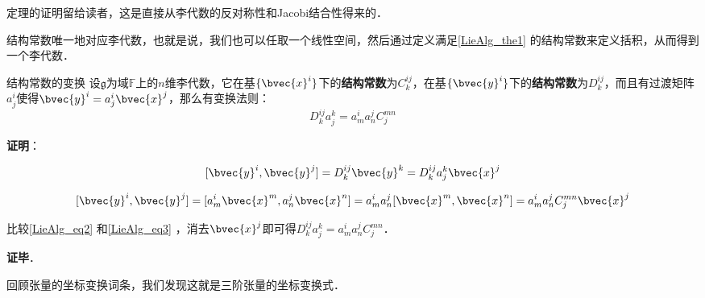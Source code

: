 定理的证明留给读者，这是直接从李代数的反对称性和Jacobi结合性得来的．

结构常数唯一地对应李代数，也就是说，我们也可以任取一个线性空间，然后通过定义满足\autoref{LieAlg_the1} 的结构常数来定义括积，从而得到一个李代数．

\begin{theorem}{结构常数的变换}
设$\mathfrak{g}$为域$\mathbb{F}$上的$n$维李代数，它在基$\{\bvec{x}^i\}$下的\textbf{结构常数}为$C_k^{ij}$，在基$\{\bvec{y}^i\}$下的\textbf{结构常数}为$D_k^{ij}$，而且有过渡矩阵$a^i_j$使得$\bvec{y}^i=a^i_j\bvec{x}^j$，那么有变换法则：
\begin{equation}
D^{ij}_ka^k_j=a^i_ma^j_nC_j^{mn}
\end{equation}

\end{theorem}

\textbf{证明}：

\begin{equation}\label{LieAlg_eq2}
[\bvec{y}^i, \bvec{y}^j]=D^{ij}_k\bvec{y}^k=D^{ij}_ka^k_j\bvec{x}^j
\end{equation}

\begin{equation}\label{LieAlg_eq3}
[\bvec{y}^i, \bvec{y}^j]=[a^i_m\bvec{x}^m, a^j_n\bvec{x}^n]=a^i_ma^j_n[\bvec{x}^m, \bvec{x}^n]=a^i_ma^j_nC_j^{mn}\bvec{x}^j
\end{equation}

比较\autoref{LieAlg_eq2} 和\autoref{LieAlg_eq3} ，消去$\bvec{x}^j$即可得$D^{ij}_ka^k_j=a^i_ma^j_nC_j^{mn}$．

\textbf{证毕}．

回顾张量的坐标变换词条，我们发现这就是三阶张量的坐标变换式．






